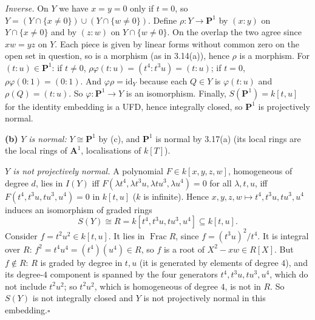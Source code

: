 \documentclass[11pt]{article}
\begin{document}
\emph{Inverse.} On $Y$ we have $x=y=0$ only if $t=0$, so $Y=(Y\cap\{x\neq0\})\cup(Y\cap\{w\ne0\})$. Define $\rho\colon Y\to\mathbf P^1$ by $(x:y)$ on $Y\cap\{x\ne0\}$ and by $(z:w)$ on $Y\cap\{w\neq0\}$. On the overlap the two agree since $xw=yz$ on $Y$. Each piece is given by linear forms without common zero on the open set in question, so is a morphism (as in 3.14(a)), hence $\rho$ is a morphism. For $(t:u)\in\mathbf P^1$: if $t\ne0$, $\rho\varphi(t:u)=(t^4:t^3u)=(t:u)$; if $t=0$, $\rho\varphi(0:1)=(0:1)$. And $\varphi\rho=\mathrm{id}_Y$ because each $Q\in Y$ is $\varphi(t:u)$ and $\rho(Q)=(t:u)$. So $\varphi\colon\mathbf P^1\to Y$ is an isomorphism. Finally, $S(\mathbf P^1)=k[t,u]$ for the identity embedding is a UFD, hence integrally closed, so $\mathbf P^1$ is projectively normal.

\textbf{(b)} \emph{$Y$ is normal:} $Y\cong\mathbf P^1$ by (c), and $\mathbf P^1$ is normal by 3.17(a) (its local rings are the local rings of $\mathbf A^1$, localisations of $k[T]$).

\emph{$Y$ is not projectively normal.} A polynomial $F\in k[x,y,z,w]$, homogeneous of degree $d$, lies in $I(Y)$ iff $F(\lambda t^4,\lambda t^3u,\lambda tu^3,\lambda u^4)=0$ for all $\lambda,t,u$, iff $F(t^4,t^3u,tu^3,u^4)=0$ in $k[t,u]$ ($k$ is infinite). Hence $x,y,z,w\mapsto t^4,t^3u,tu^3,u^4$ induces an isomorphism of graded rings
\[
S(Y)\cong R=k[t^4,t^3u,tu^3,u^4]\subseteq k[t,u].
\]
Consider $f=t^2u^2\in k[t,u]$. It lies in $\operatorname{Frac}R$, since $f=(t^3u)^2/t^4$. It is integral over $R$: $f^2=t^4u^4=(t^4)(u^4)\in R$, so $f$ is a root of $X^2-xw\in R[X]$. But $f\notin R$: $R$ is graded by degree in $t,u$ (it is generated by elements of degree $4$), and its degree-$4$ component is spanned by the four generators $t^4,t^3u,tu^3,u^4$, which do not include $t^2u^2$; so $t^2u^2$, which is homogeneous of degree $4$, is not in $R$. So $S(Y)$ is not integrally closed and $Y$ is not projectively normal in this embedding.\hfill$\square$
\end{document}
